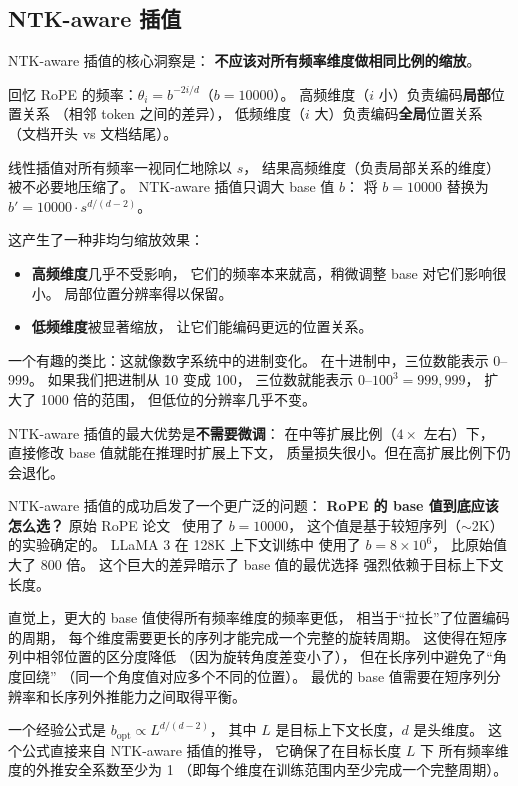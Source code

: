 \subsection{NTK-aware 插值}

NTK-aware 插值的核心洞察是：
\textbf{不应该对所有频率维度做相同比例的缩放}。

回忆 RoPE 的频率：$\theta_i = b^{-2i/d}$（$b = 10000$）。
高频维度（$i$ 小）负责编码\textbf{局部}位置关系
（相邻 token 之间的差异），
低频维度（$i$ 大）负责编码\textbf{全局}位置关系
（文档开头 vs 文档结尾）。

线性插值对所有频率一视同仁地除以 $s$，
结果高频维度（负责局部关系的维度）被不必要地压缩了。
NTK-aware 插值只调大 base 值 $b$：
将 $b = 10000$ 替换为 $b' = 10000 \cdot s^{d/(d-2)}$。

这产生了一种非均匀缩放效果：
\begin{itemize}[noitemsep]
  \item \textbf{高频维度}几乎不受影响，
        它们的频率本来就高，稍微调整 base 对它们影响很小。
        局部位置分辨率得以保留。
  \item \textbf{低频维度}被显著缩放，
        让它们能编码更远的位置关系。
\end{itemize}

一个有趣的类比：这就像数字系统中的进制变化。
在十进制中，三位数能表示 0--999。
如果我们把进制从 10 变成 100，
三位数就能表示 0--$100^3 = 999{,}999$，
扩大了 1000 倍的范围，
但低位的分辨率几乎不变。

NTK-aware 插值的最大优势是\textbf{不需要微调}：
在中等扩展比例（$4\times$ 左右）下，
直接修改 base 值就能在推理时扩展上下文，
质量损失很小。但在高扩展比例下仍会退化。

NTK-aware 插值的成功启发了一个更广泛的问题：
\textbf{RoPE 的 base 值到底应该怎么选？}
原始 RoPE 论文~\cite{su2021rope} 使用了 $b = 10000$，
这个值是基于较短序列（$\sim$2K）的实验确定的。
LLaMA 3 在 128K 上下文训练中
使用了 $b = 8 \times 10^6$，
比原始值大了 800 倍。
这个巨大的差异暗示了 base 值的最优选择
强烈依赖于目标上下文长度。

直觉上，更大的 base 值使得所有频率维度的频率更低，
相当于“拉长”了位置编码的周期，
每个维度需要更长的序列才能完成一个完整的旋转周期。
这使得在短序列中相邻位置的区分度降低
（因为旋转角度差变小了），
但在长序列中避免了“角度回绕”
（同一个角度值对应多个不同的位置）。
最优的 base 值需要在短序列分辨率和长序列外推能力之间取得平衡。

一个经验公式是 $b_{\text{opt}} \propto L^{d/(d-2)}$，
其中 $L$ 是目标上下文长度，$d$ 是头维度。
这个公式直接来自 NTK-aware 插值的推导，
它确保了在目标长度 $L$ 下
所有频率维度的外推安全系数至少为 1
（即每个维度在训练范围内至少完成一个完整周期）。

